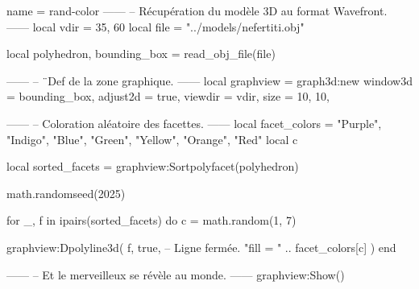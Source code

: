 \documentclass{standalone}
\begin{document}
\begin{luadraw}{name = rand-color}
------
-- Récupération du modèle 3D au format Wavefront.
------
local vdir = {35, 60}
local file = "../models/nefertiti.obj"

local polyhedron, bounding_box = read_obj_file(file)

------
-- ¨Def de la zone graphique.
------
local graphview = graph3d:new{
  window3d = bounding_box,
  adjust2d = true,
  viewdir  = vdir,
  size     = {10, 10},
}

------
-- Coloration aléatoire des facettes.
------
local facet_colors = {"Purple", "Indigo", "Blue", "Green", "Yellow", "Orange", "Red"}
local c

local sorted_facets = graphview:Sortpolyfacet(polyhedron)

math.randomseed(2025)

for _, f in ipairs(sorted_facets) do
  c = math.random(1, 7)

  graphview:Dpolyline3d(
    f,
    true,  -- Ligne fermée.
    "fill = " .. facet_colors[c]
  )
end

------
-- Et le merveilleux se révèle au monde.
------
graphview:Show()
\end{luadraw}
\end{document}
